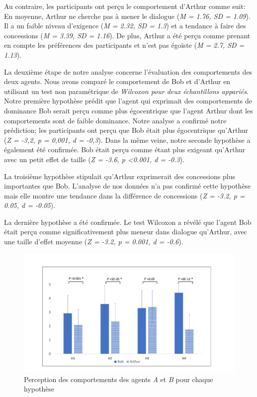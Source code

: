{			Au contraire, les participants ont perçu le comportement d'Arthur comme suit: En moyenne, Arthur ne cherche pas à mener le dialogue (\emph {M = 1.76, SD = 1.09}). Il a un faible niveau d'exigence (\emph {M = 2.32, SD = 1.3}) et a tendance à faire des concessions (\emph {M = 3.39, SD = 1.16}). De plus, Arthur a été perçu comme prenant en compte les préférences des participants et n'est pas égoïste (\emph {M = 2.7, SD = 1.13}).
			
			La deuxième étape de notre analyse concerne l'évaluation des comportements des deux agents. Nous avons comparé le comportement de Bob et d'Arthur en utilisant un test non paramétrique de \emph{Wilcoxon pour deux échantillons appariés}. Notre première hypothèse prédit que l'agent qui exprimait des comportements de dominance Bob serait perçu comme plus égocentrique que l'agent Arthur dont les comportements sont de faible dominance. Notre analyse a confirmé notre prédiction; les participants ont perçu que Bob était plus égocentrique qu'Arthur (\emph {Z = -3,2, p = 0,001, d = -0,3}). Dans la même veine, notre seconde hypothèse a également été confirmée. Bob était perçu comme étant plus exigeant qu'Arthur avec un petit effet de taille (\emph {Z = -3.6, p <0.001, d = -0.3}).
			
			La troisième hypothèse stipulait qu'Arthur exprimerait des concessions plus importantes que Bob. L'analyse de nos données n'a pas confirmé cette hypothèse mais elle montre une tendance dans la différence de concessions (\emph {Z = -3.2, p = 0.05, d = -0.05}).
			
			La dernière hypothèse a été confirmée. Le test Wilcoxon a révélé que l'agent Bob était perçu comme significativement plus meneur dans dialogue qu'Arthur, avec une taille d'effet moyenne (\emph {Z = -3.2, p = 0.001, d = -0.6}).
			
			
			\begin{figure}[t]
				\centering
				\includegraphics[width=\textwidth]{Figures/chap4/AH/res.pdf}
				\caption{Perception des comportements des agents \textit{A} et \textit{B} pour chaque hypothèse}
				\label{res}
				\end{figure}
				
}
